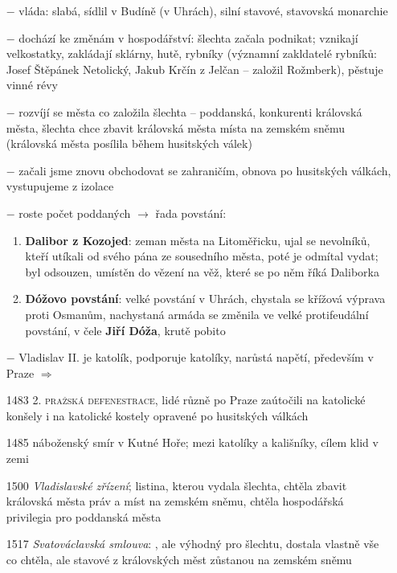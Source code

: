\documentclass{article}
\begin{document}
\begin{itemize}
    \vspace{-0.5em}
    \setlength\itemsep{0.15em}
    \item[$-$] vláda: slabá, sídlil v Budíně (v Uhrách), silní stavové, stavovská monarchie
    \item[$-$] dochází ke změnám v hospodářství: šlechta začala podnikat; vznikají velkostatky, zakládají sklárny, hutě, rybníky (významní zakldatelé rybníků: Josef Štěpánek Netolický, Jakub Krčín z Jelčan -- založil Rožmberk), pěstuje vinné révy
    \item[$-$] rozvíjí se města co založila šlechta -- poddanská, konkurenti královská města, šlechta chce zbavit královská města místa na zemském sněmu (královská města posílila během husitských válek)
    \item[$-$] začali jsme znovu obchodovat se zahraničím, obnova po husitských válkách, vystupujeme z izolace
    \item[$-$] roste počet poddaných $\rightarrow$ řada povstání:
    \begin{enumerate}
        \vspace{-0.5em}
        \setlength\itemsep{0.15em}
        \item \textbf{Dalibor z Kozojed}: zeman města na Litoměřicku, ujal se nevolníků, kteří utíkali od svého pána ze sousedního města, poté je odmítal vydat; byl odsouzen, umístěn do vězení na věž, které se po něm říká Daliborka
        \item \textbf{Dóžovo povstání}: velké povstání v Uhrách, chystala se křížová výprava proti Osmanům, nachystaná armáda se změnila ve velké protifeudální povstání, v čele \textbf{Jiří Dóža}, krutě pobito
    \end{enumerate}
    \item[$-$] Vladislav II. je katolík, podporuje katolíky, narůstá napětí, především v Praze $\Rightarrow$
    \item[1483] \textsc{2. pražská defenestrace}, lidé různě po Praze zaútočili na katolické konšely i na katolické kostely opravené po husitských válkách
    \item[1485] náboženský smír v Kutné Hoře; mezi katolíky a kališníky, cílem klid v zemi
    \item[1500] \textit{Vladislavské zřízení}; listina, kterou vydala šlechta, chtěla zbavit královská města práv a míst na zemském sněmu, chtěla hospodářská privilegia pro poddanská města
    \item[1517] \textit{Svatováclavská smlouva}: , ale výhodný pro šlechtu, dostala vlastně vše co chtěla, ale stavové z královských měst zůstanou na zemském sněmu

\end{itemize}
\end{document}
